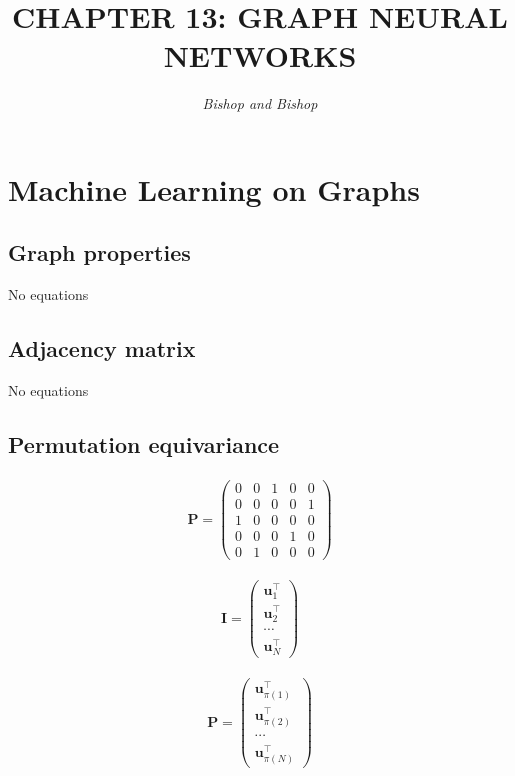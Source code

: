 \documentclass{article}
\title{\LARGE\scshape\MakeUppercase{Chapter 13: Graph Neural Networks}}
\author{\textit{Bishop and Bishop}}
\date{}
\begin{document}
\maketitle

\section{Machine Learning on Graphs}

\subsection{Graph properties}
No equations

\subsection{Adjacency matrix}
No equations

\subsection{Permutation equivariance}

\begin{align*}
\mathbf{P}=
\left(
\begin{array}{lllll}
0 & 0 & 1 & 0 & 0 \\
0 & 0 & 0 & 0 & 1 \\
1 & 0 & 0 & 0 & 0 \\
0 & 0 & 0 & 1 & 0 \\
0 & 1 & 0 & 0 & 0
\end{array}
\right)
\tag{13.1}
\end{align*}

\begin{align*}
\mathbf{I}=
\left(
\begin{array}{c}
\mathbf{u}_{1}^{\top} \\
\mathbf{u}_{2}^{\top} \\
\cdots \\
\mathbf{u}_{N}^{\top}
\end{array}
\right)
\tag{13.2}
\end{align*}

\begin{align*}
\mathbf{P}=\left(
\begin{array}{c}
\mathbf{u}_{\pi(1)}^{\top} \\
\mathbf{u}_{\pi(2)}^{\top} \\
\cdots \\
\mathbf{u}_{\pi(N)}^{\top}
\end{array}
\right)
\tag{13.3}
\end{align*}
\end{document}
